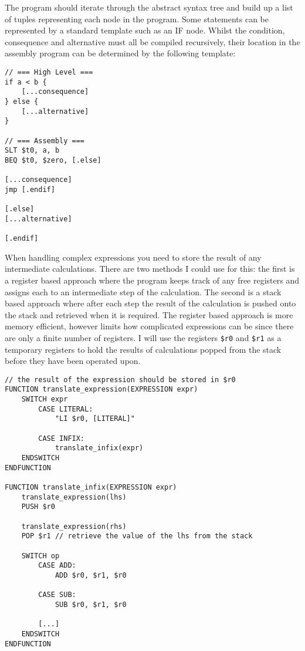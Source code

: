 The program should iterate through the abstract syntax tree and build up a list of tuples representing each node in the program. Some statements can be represented by a standard template such as an IF node. Whilst the condition, consequence and alternative must all be compiled recursively, their location in the assembly program can be determined by the following template:

\begin{lstlisting}
// === High Level === 
if a < b {
    [...consequence]
} else {
    [...alternative]
}

// === Assembly ===
SLT $t0, a, b
BEQ $t0, $zero, [.else]

[...consequence] 
jmp [.endif]

[.else]
[...alternative] 

[.endif]
\end{lstlisting}

When handling complex expressions you need to store the result of any intermediate calculations. There are two methods I could use for this: the first is a register based approach where the program keeps track of any free registers and assigns each to an intermediate step of the calculation. The second is a stack based approach where after each step the result of the calculation is pushed onto the stack and retrieved when it is required. The register based approach is more memory efficient, however limits how complicated expressions can be since there are only a finite number of registers. I will use the registers \texttt{\$r0} and \texttt{\$r1} as a temporary registers to hold the results of calculations popped from the stack before they have been operated upon.

\begin{lstlisting}
// the result of the expression should be stored in $r0
FUNCTION translate_expression(EXPRESSION expr) 
    SWITCH expr 
        CASE LITERAL:
            "LI $r0, [LITERAL]"

        CASE INFIX:
            translate_infix(expr)
    ENDSWITCH
ENDFUNCTION

FUNCTION translate_infix(EXPRESSION expr) 
    translate_expression(lhs)
    PUSH $r0

    translate_expression(rhs)
    POP $r1 // retrieve the value of the lhs from the stack

    SWITCH op 
        CASE ADD:
            ADD $r0, $r1, $r0

        CASE SUB:
            SUB $r0, $r1, $r0 

        [...]
    ENDSWITCH
ENDFUNCTION
\end{lstlisting}

